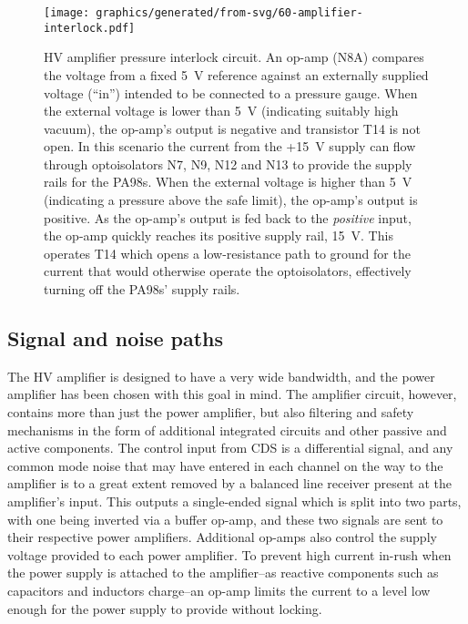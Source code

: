 
\begin{figure}
  \centering
  \texttt{[image: graphics/generated/from-svg/60-amplifier-interlock.pdf]}
  \caption{\gls{HV} amplifier pressure interlock circuit. An op-amp (N8A) compares the voltage from a fixed \SI{5}{\volt} reference against an externally supplied voltage (``in'') intended to be connected to a pressure gauge. When the external voltage is lower than \SI{5}{\volt} (indicating suitably high vacuum), the op-amp's output is negative and transistor T14 is not open. In this scenario the current from the +\SI{15}{\volt} supply can flow through optoisolators N7, N9, N12 and N13 to provide the supply rails for the PA98s. When the external voltage is higher than \SI{5}{\volt} (indicating a pressure above the safe limit), the op-amp's output is positive. As the op-amp's output is fed back to the \emph{positive} input, the op-amp quickly reaches its positive supply rail, \SI{15}{\volt}. This operates T14 which opens a low-resistance path to ground for the current that would otherwise operate the optoisolators, effectively turning off the PA98s' supply rails.}
  \label{fig:amplifier-interlock}
\end{figure}

\subsection{\label{sec:signal-and-noise-paths}Signal and noise paths}
The \gls{HV} amplifier is designed to have a very wide bandwidth, and the power amplifier has been chosen with this goal in mind. The amplifier circuit, however, contains more than just the power amplifier, but also filtering and safety mechanisms in the form of additional integrated circuits and other passive and active components. The control input from \gls{CDS} is a differential signal, and any common mode noise that may have entered in each channel on the way to the amplifier is to a great extent removed by a balanced line receiver present at the amplifier's input. This outputs a single-ended signal which is split into two parts, with one being inverted via a buffer op-amp, and these two signals are sent to their respective power amplifiers. Additional op-amps also control the supply voltage provided to each power amplifier. To prevent high current in-rush when the power supply is attached to the amplifier--as reactive components such as capacitors and inductors charge--an op-amp limits the current to a level low enough for the power supply to provide without locking.

